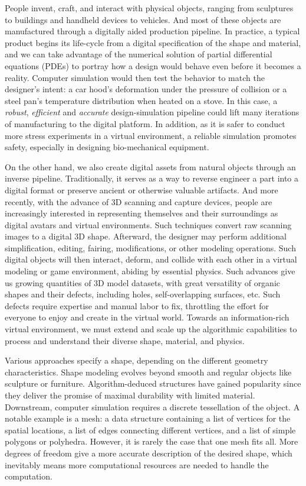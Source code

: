 People invent, craft, and interact with physical objects, ranging from sculptures to buildings and handheld devices to vehicles. And most of these objects are manufactured through a digitally aided production pipeline.
In practice, a typical product begins its life-cycle from a digital specification of the shape and material, 
and we can take advantage of the numerical solution of partial differential equations (PDEs) to portray how a design would behave even before it becomes a reality.
Computer simulation would then test the behavior to match the designer's intent: a car hood's deformation under the pressure of collision or a steel pan's temperature distribution when heated on a stove. In this case, a \emph{robust}, \emph{efficient} and \emph{accurate} design-simulation pipeline could lift many iterations of manufacturing to the digital platform. In addition, as it is safer to conduct more stress experiments in a virtual environment, a reliable simulation promotes safety, especially in designing bio-mechanical equipment.

On the other hand, we also create digital assets from natural objects through an inverse pipeline. Traditionally, it serves as a way to reverse engineer a part into a digital format or preserve ancient or otherwise valuable artifacts. And more recently, with the advance of 3D scanning and capture devices, people are increasingly interested in representing themselves and their surroundings as digital avatars and virtual environments. Such techniques convert raw scanning images to a digital 3D shape. 
Afterward, the designer may perform additional simplification, editing, fairing, modifications, or other modeling operations. Such digital objects will then interact, deform, and collide with each other in a virtual modeling or game environment, abiding by essential physics.
Such advances give us growing quantities of 3D model datasets, with great versatility of organic shapes and their defects, including holes, self-overlapping surfaces, etc.
Such defects require expertise and manual labor to fix, throttling the effort for everyone to enjoy and create in the virtual world. 
Towards an information-rich virtual environment, we must extend and scale up the algorithmic capabilities to process and understand their diverse shape, material, and physics.

Various approaches specify a shape, depending on the different geometry characteristics. Shape modeling evolves beyond smooth and regular objects like sculpture or furniture. Algorithm-deduced structures have gained popularity since they deliver the promise of maximal durability with limited material. Downstream, computer simulation requires a discrete tessellation of the object. A notable example is a mesh: a data structure containing a list of vertices for the spatial locations, a list of edges connecting different vertices, and a list of simple polygons or polyhedra. However, it is rarely the case that one mesh fits all. More degrees of freedom give a more accurate description of the desired shape, which inevitably means more computational resources are needed to handle the computation.

